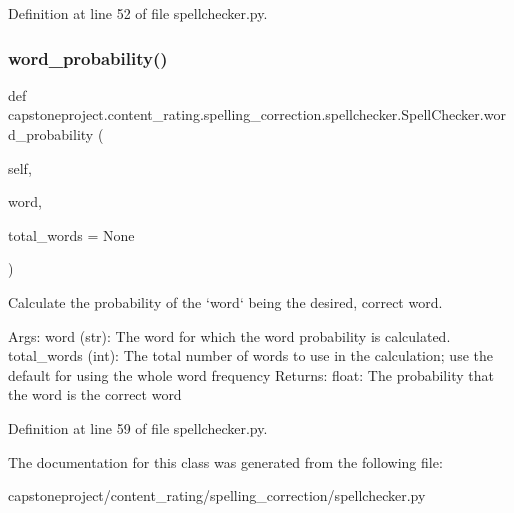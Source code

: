 Definition at line 52 of file spellchecker.\+py.

\mbox{\label{classcapstoneproject_1_1content__rating_1_1spelling__correction_1_1spellchecker_1_1_spell_checker_a7a2a7289252188ae289e4cd9f46d6b25}} 
\subsubsection{\texorpdfstring{word\+\_\+probability()}{word\_probability()}}
{\footnotesize\ttfamily def capstoneproject.\+content\+\_\+rating.\+spelling\+\_\+correction.\+spellchecker.\+Spell\+Checker.\+word\+\_\+probability (\begin{DoxyParamCaption}\item[{}]{self,  }\item[{}]{word,  }\item[{}]{total\+\_\+words = {\ttfamily None} }\end{DoxyParamCaption})}

\begin{DoxyVerb}Calculate the probability of the `word` being the desired, correct word.

    Args:
word (str): The word for which the word probability is calculated.
total_words (int): The total number of words to use in the calculation; use the default for using
the whole word frequency
    Returns:
float: The probability that the word is the correct word
\end{DoxyVerb}
 

Definition at line 59 of file spellchecker.\+py.



The documentation for this class was generated from the following file\+:\begin{DoxyCompactItemize}
\item 
capstoneproject/content\+\_\+rating/spelling\+\_\+correction/spellchecker.\+py\end{DoxyCompactItemize}
